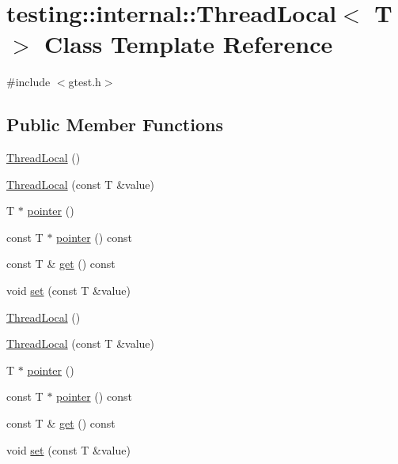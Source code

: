 \hypertarget{classtesting_1_1internal_1_1_thread_local}{\section{testing\-:\-:internal\-:\-:Thread\-Local$<$ T $>$ Class Template Reference}
\label{classtesting_1_1internal_1_1_thread_local}
}


{\ttfamily \#include $<$gtest.\-h$>$}

\subsection*{Public Member Functions}
\begin{DoxyCompactItemize}
\item 
\hyperlink{classtesting_1_1internal_1_1_thread_local_a106f3a3ad15d08f95f9887105d2a1af5}{Thread\-Local} ()
\item 
\hyperlink{classtesting_1_1internal_1_1_thread_local_a85610bdfdbc93a4c56215e0aad7da870}{Thread\-Local} (const T \&value)
\item 
T $\ast$ \hyperlink{classtesting_1_1internal_1_1_thread_local_a882f57fed4b074de83693c0c0fe62858}{pointer} ()
\item 
const T $\ast$ \hyperlink{classtesting_1_1internal_1_1_thread_local_af4b33c12fd2da7d43d8654feccca77f7}{pointer} () const 
\item 
const T \& \hyperlink{classtesting_1_1internal_1_1_thread_local_a9cfa47ae6e9e8c19fe8782e2e9c1b13e}{get} () const 
\item 
void \hyperlink{classtesting_1_1internal_1_1_thread_local_ab5ebc7ba07426cef7167afa2a7707eb4}{set} (const T \&value)
\item 
\hyperlink{classtesting_1_1internal_1_1_thread_local_a106f3a3ad15d08f95f9887105d2a1af5}{Thread\-Local} ()
\item 
\hyperlink{classtesting_1_1internal_1_1_thread_local_a85610bdfdbc93a4c56215e0aad7da870}{Thread\-Local} (const T \&value)
\item 
T $\ast$ \hyperlink{classtesting_1_1internal_1_1_thread_local_a882f57fed4b074de83693c0c0fe62858}{pointer} ()
\item 
const T $\ast$ \hyperlink{classtesting_1_1internal_1_1_thread_local_af4b33c12fd2da7d43d8654feccca77f7}{pointer} () const 
\item 
const T \& \hyperlink{classtesting_1_1internal_1_1_thread_local_a9cfa47ae6e9e8c19fe8782e2e9c1b13e}{get} () const 
\item 
void \hyperlink{classtesting_1_1internal_1_1_thread_local_ab5ebc7ba07426cef7167afa2a7707eb4}{set} (const T \&value)
\end{DoxyCompactItemize}


